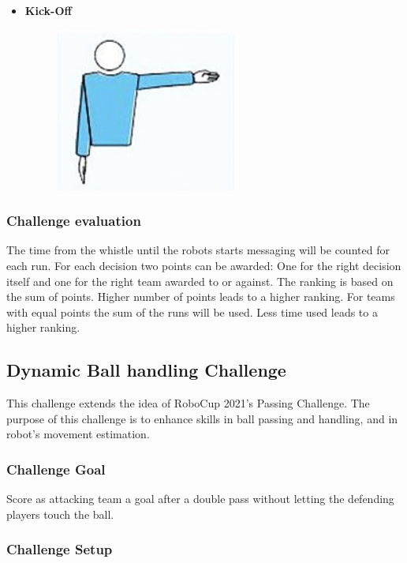         \begin{itemize}
            \item \textbf{Kick-Off}
            \begin{figure}[ht!]
                \includegraphics{figs/kick-off_referee.jpg}
            \end{figure}
        \end{itemize}

    \subsubsection{Challenge evaluation}
        The time from the whistle until the robots starts messaging will be counted for each run.
        For each decision two points can be awarded: One for the right decision itself and one for the right team awarded to or against.
        The ranking is based on the sum of points. Higher number of points leads to a higher ranking. For teams with equal points the sum of the runs will be used. Less time used leads to a higher ranking.


\subsection{Dynamic Ball handling Challenge}

    This challenge extends the idea of RoboCup 2021's Passing Challenge. The purpose of this challenge is to enhance skills in ball passing and handling, and in robot's movement estimation.

    \subsubsection{Challenge Goal}

        Score as attacking team a goal after a double pass without letting the defending players touch the ball.

    \subsubsection{Challenge Setup}

